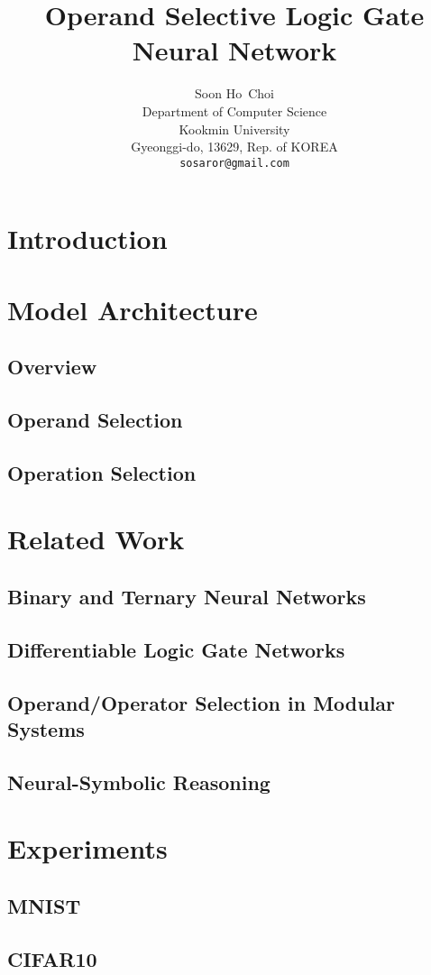 \documentclass{article}
\title{Operand Selective Logic Gate Neural Network}
\author{%
  Soon Ho~Choi\\
  Department of Computer Science\\
  Kookmin University\\
  Gyeonggi-do, 13629, Rep. of KOREA \\
  \texttt{sosaror@gmail.com} \\
}
\begin{document}
\maketitle



\section{Introduction}
\section{Model Architecture}
\subsection{Overview}
\subsection{Operand Selection}
\subsection{Operation Selection}
\section{Related Work}
\subsection{Binary and Ternary Neural Networks}
\subsection{Differentiable Logic Gate Networks}
\subsection{Operand/Operator Selection in Modular Systems}
\subsection{Neural-Symbolic Reasoning}
\section{Experiments}
\subsection{MNIST}
\subsection{CIFAR10}
\end{document}
